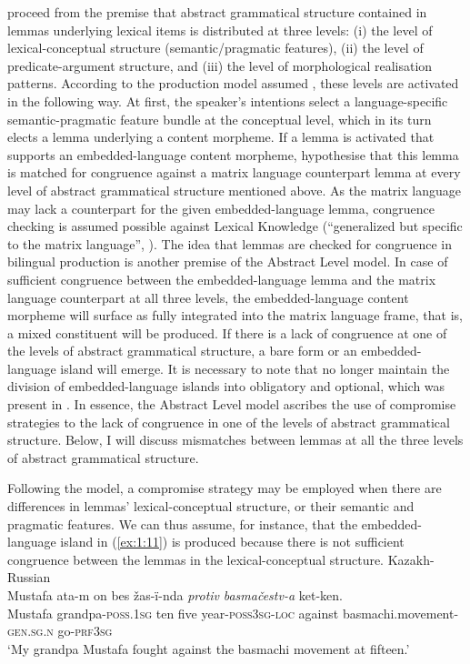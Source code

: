 \citet{myers-scotton-matching-1995} proceed from the premise that abstract grammatical structure contained in lemmas underlying lexical items is distributed at three levels: (i) the level of lexical-conceptual structure (semantic/pragmatic features), (ii) the level of predicate-argument structure, and (iii) the level of morphological realisation patterns. According to the production model assumed \citep[23--25, 76--78]{myers-scotton-contact-2002}, these levels are activated in the following way. At first, the speaker's intentions select a language-specific semantic-pragmatic feature bundle at the conceptual level, which in its turn elects a lemma underlying a content morpheme. If a lemma is activated that supports an embedded-language content morpheme, \citet{myers-scotton-matching-1995} hypothesise that this lemma is matched for congruence against a matrix language counterpart lemma at every level of abstract grammatical structure mentioned above. As the matrix language may lack a counterpart for the given embedded-language lemma, congruence checking is assumed possible against Lexical Knowledge (``generalized but specific to the matrix language'', \citealt[97]{myers-scotton-contact-2002}). The idea that lemmas are checked for congruence in bilingual production is another premise of the Abstract Level model. In case of sufficient congruence between the embedded-language lemma and the matrix language counterpart at all three levels, the embedded-language content morpheme will surface as fully integrated into the matrix language frame, that is, a mixed constituent will be produced. If there is a lack of congruence at one of the levels of abstract grammatical structure, a bare form or an embedded-language island will emerge. It is necessary to note that \citet[][]{myers-scotton-matching-1995} no longer maintain the division of embedded-language islands into obligatory and optional, which was present in \citet{myers-scotton-duelling-1993}. In essence, the Abstract Level model ascribes the use of compromise strategies to the lack of congruence in one of the levels of abstract grammatical structure. Below, I will discuss mismatches between lemmas at all the three levels of abstract grammatical structure.

Following the model, a compromise strategy may be employed when there are differences in lemmas' lexical-conceptual structure, or their semantic and pragmatic features. We can thus assume, for instance, that the embedded-language island in (\ref{ex:1:11}) is produced because there is not sufficient congruence between the lemmas in the lexical-conceptual structure.
\ea{\label{ex:1:11}}
Kazakh-Russian \citep[41--42]{muhamedowa-untersuchung-2006}\\
\gll 
Mustafa ata-m on bes žas-ï-nda \textit{protiv} \textit{basmačestv-a} ket-ken.\\
	Mustafa grandpa-\textsc{poss.1sg} ten five year-\textsc{poss3sg-loc} against basmachi.movement-\textsc{gen.sg.n} go-\textsc{prf3sg}\\
\glt `My grandpa Mustafa fought against the basmachi movement at fifteen.' 
\z

